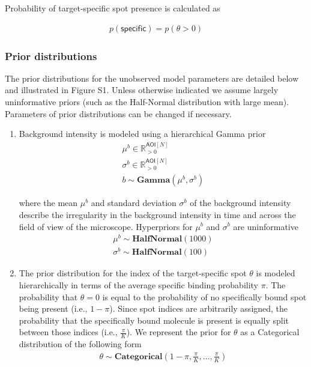 Probability of target-specific spot presence is calculated as

\begin{gather*}
    p(\mathsf{specific}) = p(\theta > 0)
\end{gather*}

\subsubsection*{Prior distributions}

The prior distributions for the unobserved model parameters are detailed below and illustrated in Figure S1. Unless otherwise indicated we assume largely uninformative priors (such as the Half-Normal distribution with large mean). Parameters of prior distributions can be changed if necessary.
%
\begin{enumerate}
    \item Background intensity is modeled using a hierarchical Gamma prior
%
\begin{gather*}
    \mu^b \in \mathbb{R}_{>0}^{\mathsf{AOI}[N]} \\
    \sigma^b \in \mathbb{R}_{>0}^{\mathsf{AOI}[N]} \\
    b \sim \mathbf{Gamma}(\mu^b, \sigma^b)
\end{gather*}

\noindent
where the mean $\mu^b$ and standard deviation $\sigma^b$ of the background intensity describe the irregularity in the background intensity in time and across the field of view of the microscope. Hyperpriors for $\mu^b$ and $\sigma^b$ are uninformative
%
\begin{gather*}
    \mu^b \sim \mathbf{HalfNormal}(1000) \\
    \sigma^b \sim \mathbf{HalfNormal}(100)
\end{gather*}

\item The prior distribution for the index of the target-specific spot $\theta$ is modeled hierarchically in terms of the average specific binding probability $\pi$. The probability that $\theta = 0$ is equal to the probability of no specifically bound spot being present (i.e., $1-\pi$). Since spot indices are arbitrarily assigned, the probability that the specifically bound molecule is present is equally split between those indices (i.e., $\frac{\pi}{K}$). We represent the prior for $\theta$ as a Categorical distribution of the following form
%
\begin{gather*}
    \theta \sim \mathbf{Categorical}\left(1 - \pi, \frac{\pi}{K}, \dots, \frac{\pi}{K}\right)
\end{gather*}


\end{enumerate}

